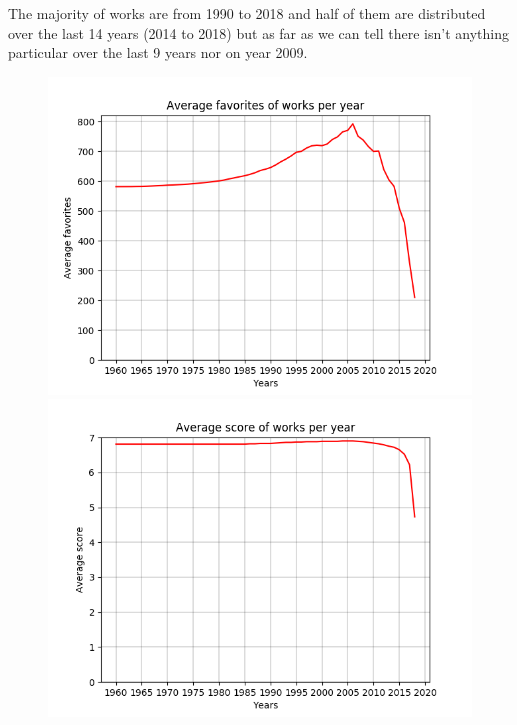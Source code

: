 The majority of works are from 1990 to 2018 and half of them are distributed over the last 14 years (2014 to 2018) but as far as we can tell there isn’t anything particular over the last 9 years nor on year 2009.

\begin{figure}[!hbt]
	\begin{center}
	\includegraphics[width=\columnwidth]{graphics/avgFavoritesPerYear_1960-2018.png}
	\includegraphics[width=\columnwidth]{graphics/avgScorePerYear_1960-2018.png}

\end{center}
\end{figure}
